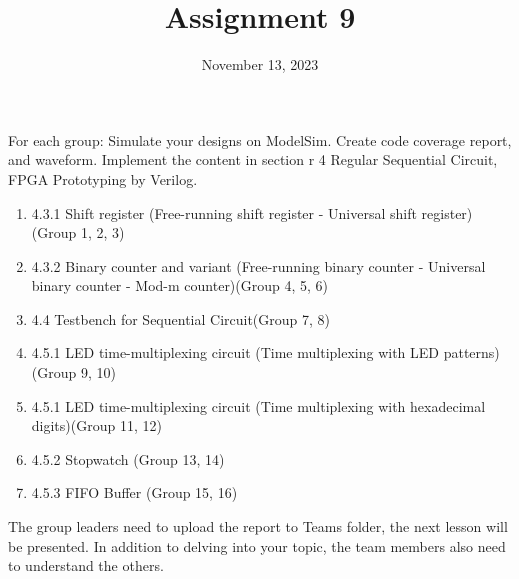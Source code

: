 \documentclass{vhdl-assignment}
\title{Assignment 9}
\date{November 13, 2023}
\begin{document}
\maketitle
\thispagestyle{fancy}

For each group: Simulate your designs on ModelSim. Create code coverage report, and waveform.
Implement the content in section r 4 Regular
Sequential Circuit, FPGA Prototyping by Verilog.

\begin{enumerate}
    \item 4.3.1 Shift register (Free-running shift register - Universal shift register) (Group 1, 2, 3)
    \item 4.3.2 Binary counter and variant (Free-running binary counter - Universal binary counter - Mod-m counter)(Group 4, 5, 6)
    \item 4.4 Testbench for Sequential Circuit(Group 7, 8)
    \item 4.5.1 LED time-multiplexing circuit (Time multiplexing with LED patterns)(Group 9, 10)
    \item 4.5.1 LED time-multiplexing circuit (Time multiplexing with hexadecimal digits)(Group 11, 12)
    \item 4.5.2 Stopwatch (Group 13, 14)
    \item 4.5.3 FIFO Buffer (Group 15, 16)
\end{enumerate}

The group leaders need to upload the report to Teams folder, the next lesson will be presented.
In addition to delving into your topic, the team members also need to understand the others.
\end{document}
